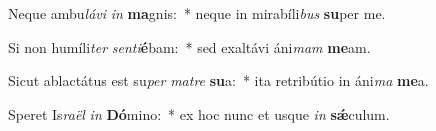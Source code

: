 \item Neque ambu\textit{lá}\textit{vi} \textit{in} \textbf{ma}gnis:~* neque in mirabíli\textit{bus} \textbf{su}per me.
\item Si non humíli\textit{ter} \textit{sen}\textit{ti}\textbf{é}bam:~* sed exaltávi áni\textit{mam} \textbf{me}am.
\item Sicut ablactátus est su\textit{per} \textit{ma}\textit{tre} \textbf{su}a:~* ita retribútio in áni\textit{ma} \textbf{me}a.
\item Speret Is\textit{ra}\textit{ël} \textit{in} \textbf{Dó}mino:~* ex hoc nunc et usque \textit{in} \textbf{sǽ}culum.
